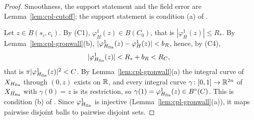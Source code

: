 \begin{proof}
Smoothness, the support statement and the field error are Lemma~\ref{lem:cpl-cutoff}; the support statement is
condition (a) of .

Let $z\in B(s_i,c_i)$. By (C1), $\varphi^1_H(z)\in B(C_0)$, that is $|\varphi^1_H(z)|\le R_*$. By
Lemma~\ref{lem:cpl-gronwall}(b), $|\varphi^1_{H_{\mathrm{fin}}}(z)-\varphi^1_H(z)|<b_R$, hence, by (C4),
\[
 |\varphi^1_{H_{\mathrm{fin}}}(z)|<R_*+b_R<R_C,
\]
that is $\pi|\varphi^1_{H_{\mathrm{fin}}}(z)|^2<C$. By Lemma~\ref{lem:cpl-gronwall}(a) the integral curve of $X_{H_{\mathrm{fin}}}$ through
$(0,z)$ exists on $\mathbb{R}$, and every integral curve $\gamma\colon[0,1]\to\mathbb{R}^{2n}$ of $X_{H_{\mathrm{fin}}}$ with $\gamma(0)=z$ is its
restriction, so $\gamma(1)=\varphi^1_{H_{\mathrm{fin}}}(z)\in B^{\circ}(C)$. This is condition (b) of .
Since $\varphi^1_{H_{\mathrm{fin}}}$ is injective (Lemma~\ref{lem:cpl-gronwall}(a)), it maps pairwise disjoint balls to pairwise
disjoint sets.
\end{proof}
